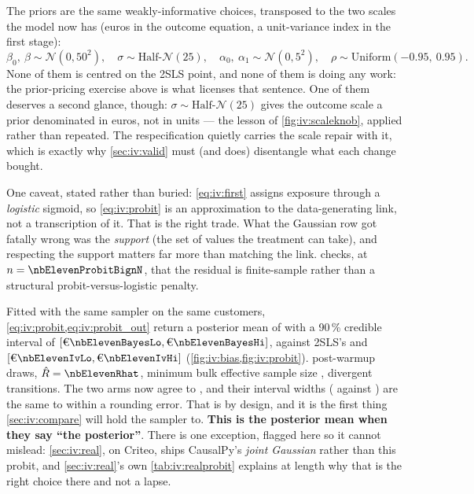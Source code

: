 The priors are the same weakly-informative choices, transposed to the two scales the model now has
(euros in the outcome equation, a unit-variance index in the first stage):
%
\begin{equation}
  \beta_0,\ \beta \sim \mathcal N(0, 50^{2}), \quad
  \sigma \sim \text{Half-}\mathcal N(25), \quad
  \alpha_0,\ \alpha_1 \sim \mathcal N(0, 5^{2}), \quad
  \rho \sim \text{Uniform}(-0.95,\ 0.95).
  \label{eq:iv:probit_priors}
\end{equation}
%
None of them is centred on the 2SLS point, and none of them is doing any work: the
prior-pricing exercise above is what licenses that sentence. One of them deserves a second
glance, though: $\sigma \sim \text{Half-}\mathcal N(25)$ gives the outcome scale a prior
denominated in euros, not in units --- the lesson of \cref{fig:iv:scaleknob}, applied rather
than repeated. The respecification quietly carries the scale repair with it, which is exactly
why \cref{sec:iv:valid} must (and does) disentangle what each change bought.

One caveat, stated rather than buried: \cref{eq:iv:first} assigns exposure through a
\emph{logistic} sigmoid, so \cref{eq:iv:probit} is an approximation to the data-generating link, not
a transcription of it. That is the right trade. What the Gaussian row got fatally wrong was the
\emph{support} (the set of values the treatment can take), and respecting the support matters far
more than matching the link.  checks, at $n = \nbElevenProbitBignN$, that the
residual is finite-sample rather than a structural probit-versus-logistic penalty.

Fitted with the same sampler on the same \nbElevenN{} customers, \cref{eq:iv:probit,eq:iv:probit_out}
return a posterior mean of \eur{\nbElevenBayesMean} with a 90\,\% credible interval of
$[\eur{\nbElevenBayesLo}, \eur{\nbElevenBayesHi}]$, against 2SLS's \eur{\nbElevenIvEst} and
$[\eur{\nbElevenIvLo}, \eur{\nbElevenIvHi}]$ (\cref{fig:iv:bias,fig:iv:probit}). \nbElevenNDraws{}
post-warmup draws, $\hat R = \nbElevenRhat$, minimum bulk effective sample size \nbElevenEss,
\nbElevenDivergences{} divergent transitions. The two arms now agree to \eur{\nbElevenEstDiff}, and
their interval widths (\eur{\nbElevenBayesWidth} against \eur{\nbElevenIvWidth}) are the same to
within a rounding error. That is by design, and it is the first thing \cref{sec:iv:compare} will hold
the sampler to. \textbf{This is the posterior  mean when
they say ``the posterior''}. There is one exception, flagged here so it cannot mislead:
\cref{sec:iv:real}, on Criteo, ships CausalPy's \emph{joint Gaussian} rather than this probit, and
\cref{sec:iv:real}'s own \cref{tab:iv:realprobit} explains at length why that is the right choice
there and not a lapse.

